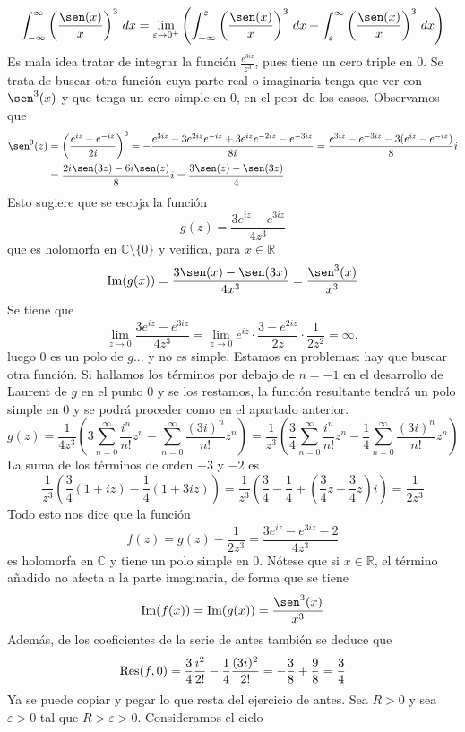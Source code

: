 \documentclass[11pt]{report}
\makeatletter
\renewenvironment{proof}[1][\proofname]{\par
  \pushQED{\qed}%
  \normalfont \topsep\z@skip %
  \trivlist
  \item[\hskip\labelsep
        \itshape
    #1\@addpunct{.}]\ignorespaces
}{%
  \popQED\endtrivlist\@endpefalse
}
\newcommand{\R}{\mathbb R}
\newcommand{\C}{\mathbb C}
\makeatother
\begin{document}
\begin{proof}
\begin{enumerate}
\[\int_{-\infty}^{\infty}\left(\frac{\sen(x)}{x}\right)^3\, dx = \lim_{\varepsilon \to 0^+} \left(\int_{-\infty}^\varepsilon \left(\frac{\sen(x)}{x}\right)^3\, dx+\int_\varepsilon^\infty \left(\frac{\sen(x)}{x}\right)^3\, dx\right)\]
Es mala idea tratar de integrar la función $\frac{e^{3iz}}{z^3}$, pues tiene un cero triple en $0$. Se trata de buscar otra función cuya parte real o imaginaria tenga que ver con $\sen^3(x)$ y que tenga un cero simple en $0$, en el peor de los casos. Observamos que
\[\begin{aligned}[t]
  \sen^3(z) &= \left(\frac{e^{iz}-e^{-iz}}{2i}\right)^3 = -\frac{e^{3iz}-3e^{2iz}e^{-iz}+3e^{iz}e^{-2iz}-e^{-3iz}}{8i} = \frac{e^{3iz}-e^{-3iz}-3(e^{iz}-e^{-iz})}{8}i \\
  &= \frac{2i\sen(3z)-6i\sen(z)}{8}i = \frac{3\sen(z)-\sen(3z)}{4}
\end{aligned}
\]
Esto sugiere que se escoja la función
\[g(z)=\frac{3e^{iz}-e^{3iz}}{4z^3}\]
que es holomorfa en $\C \setminus \{0\}$ y verifica, para $x \in \R$
\[\textup{Im}(g(x)) = \frac{3\sen(x)-\sen(3x)}{4x^3} = \frac{\sen^3(x)}{x^3}\]
Se tiene que
\[\lim_{z \to 0} \frac{3e^{iz}-e^{3iz}}{4z^3}= \lim_{z \to 0} e^{iz} \cdot \frac{3-e^{2iz}}{2z} \cdot \frac{1}{2z^2}= \infty,\]
luego $0$ es un polo de $g$... y no es simple. Estamos en problemas: hay que buscar otra función. Si hallamos los términos por debajo de $n=-1$ en el desarrollo de Laurent de $g$ en el punto $0$ y se los restamos, la función resultante tendrá un polo simple en $0$ y se podrá proceder como en el apartado anterior.
\[g(z)=\frac{1}{4z^3}\left(3\sum_{n=0}^\infty \frac{i^n}{n!}z^n-\sum_{n=0}^\infty \frac{(3i)^n}{n!}z^n\right) = \frac{1}{z^3}\left(\frac{3}{4}\sum_{n=0}^\infty \frac{i^n}{n!}z^n-\frac{1}{4}\sum_{n=0}^\infty \frac{(3i)^n}{n!}z^n\right)\]
La suma de los términos de orden $-3$ y $-2$ es 
\[\frac{1}{z^3}\left(\frac{3}{4}\left(1+iz\right)-\frac{1}{4}\left(1+3iz\right)\right) = \frac{1}{z^3}\left(\frac{3}{4}-\frac{1}{4}+\left(\frac{3}{4}z-\frac{3}{4}z\right)i\right) = \frac{1}{2z^3}\]
Todo esto nos dice que la función
\[f(z)=g(z)-\frac{1}{2z^3} = \frac{3e^{iz}-e^{3iz}-2}{4z^3}\]
es holomorfa en $\C$ y tiene un polo simple en $0$. Nótese que si $x \in \R$, el término añadido no afecta a la parte imaginaria, de forma que se tiene \[\textup{Im}(f(x)) = \textup{Im}(g(x)) = \frac{\sen^3(x)}{x^3}\] Además, de los coeficientes de la serie de antes también se deduce que
\[\textup{Res}(f,0) =\frac{3}{4}\frac{i^2}{2!}-\frac{1}{4}\frac{(3i)^2}{2!} = -\frac{3}{8}+\frac{9}{8} = \frac{3}{4}\]
Ya se puede copiar y pegar lo que resta del ejercicio de antes. Sea $R>0$ y sea $\varepsilon>0$ tal que $R>\varepsilon>0$. Consideramos el ciclo

\end{enumerate}
\end{proof}
\end{document}
